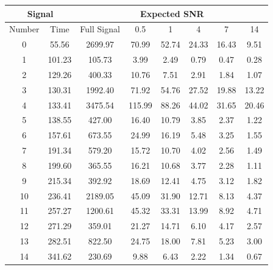 \begin{tabular}{|cc|c|ccccc|}
\hline
\multicolumn{2}{|c|}{Signal}& \multicolumn{6}{c|}{Expected SNR} \\
\hline
Number & Time  & Full Signal & 0.5 & 1 & 4 & 7 & 14 \\
\hline
0 & 55.56 & 2699.97 & 70.99 & 52.74 & 24.33 & 16.43 & 9.51 \\
1 & 101.23 & 105.73 & 3.99 & 2.49 & 0.79 & 0.47 & 0.28 \\
2 & 129.26 & 400.33 & 10.76 & 7.51 & 2.91 & 1.84 & 1.07 \\
3 & 130.31 & 1992.40 & 71.92 & 54.76 & 27.52 & 19.88 & 13.22 \\
4 & 133.41 & 3475.54 & 115.99 & 88.26 & 44.02 & 31.65 & 20.46 \\
5 & 138.55 & 427.00 & 16.40 & 10.79 & 3.85 & 2.37 & 1.22 \\
6 & 157.61 & 673.55 & 24.99 & 16.19 & 5.48 & 3.25 & 1.55 \\
7 & 191.34 & 579.20 & 15.72 & 10.70 & 4.02 & 2.56 & 1.49 \\
8 & 199.60 & 365.55 & 16.21 & 10.68 & 3.77 & 2.28 & 1.11 \\
9 & 215.34 & 392.92 & 18.69 & 12.41 & 4.75 & 3.12 & 1.82 \\
10 & 236.41 & 2189.05 & 45.09 & 31.90 & 12.71 & 8.13 & 4.37 \\
11 & 257.27 & 1200.61 & 45.32 & 33.31 & 13.99 & 8.92 & 4.71 \\
12 & 271.29 & 359.01 & 21.27 & 14.71 & 6.10 & 4.17 & 2.57 \\
13 & 282.51 & 822.50 & 24.75 & 18.00 & 7.81 & 5.23 & 3.00 \\
14 & 341.62 & 230.69 & 9.88 & 6.43 & 2.22 & 1.34 & 0.67 \\
\hline
\end{tabular}